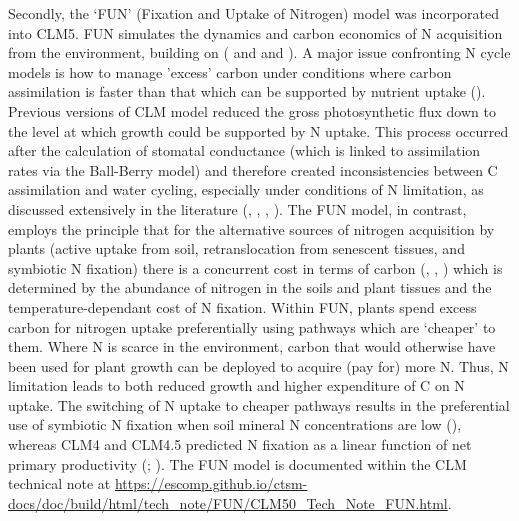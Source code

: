 \documentclass[draft,linenumbers]{agujournal}
\begin{document}
Secondly, the `FUN' (Fixation and Uptake of Nitrogen) model was incorporated into CLM5. FUN simulates the dynamics and carbon economics of N acquisition from the environment, building on (\cite{fisher2010fun} and \cite{brzostek2014} and \cite{shi2016}). A major issue confronting N cycle models is how to manage 'excess' carbon under conditions where carbon assimilation is faster than that which can be supported by nutrient uptake (\cite{dekauwe2014}). Previous versions of CLM model reduced the gross photosynthetic flux down to the level at which growth could be supported by N uptake. This process occurred after the calculation of stomatal conductance (which is linked to assimilation rates via the Ball-Berry model) and therefore created inconsistencies between C assimilation and water cycling, especially under conditions of N limitation, as discussed extensively in the literature (\cite{medlyn2011}, \cite{bonan2012}, \cite{dekauwe2014}, \cite{walker2014}). The FUN model, in contrast, employs the principle that for the alternative sources of nitrogen acquisition by plants (active uptake from soil, retranslocation from senescent tissues, and symbiotic N fixation) there is a concurrent cost in terms of carbon (\cite{bloom1985}, \cite{jiang2017}, \cite{terrer2018}) which is determined by the abundance of nitrogen in the soils and plant tissues and the temperature-dependant cost of N fixation. Within FUN, plants spend excess carbon for nitrogen uptake preferentially using pathways which are `cheaper' to them. Where N is scarce in the environment, carbon that would otherwise have been used for plant growth can be deployed to acquire (pay for) more N. Thus, N limitation leads to both reduced growth and higher expenditure of C on N uptake.   The switching of N uptake to cheaper pathways results in the preferential use of symbiotic N fixation when soil mineral N concentrations are low (\cite{vitousek2002}), whereas CLM4 and CLM4.5 predicted N fixation as a linear function of net primary productivity (\cite{cleveland1999}; \cite{wieder2015}).   The FUN model is documented within the CLM technical note at \url{https://escomp.github.io/ctsm-docs/doc/build/html/tech_note/FUN/CLM50_Tech_Note_FUN.html}. 
 
\end{document}
